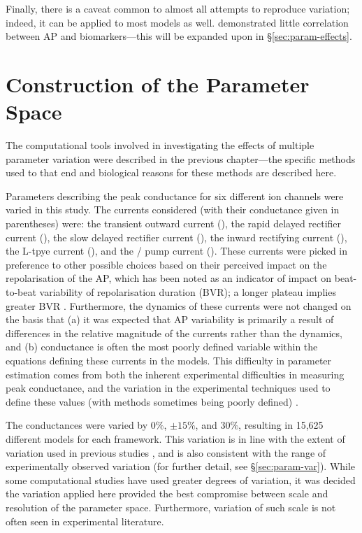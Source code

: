 \documentclass[../thesis-main.tex]{subfiles}
\begin{document}
Finally, there is a caveat common to almost all attempts to reproduce variation; indeed, it can be applied to most models as well. \citet{Walmsley2013} demonstrated little correlation between AP and \ca{} biomarkers---this will be expanded upon in \S\ref{sec:param-effects}.

\section{Construction of the Parameter Space}
\label{sec:paramSpace-methods}
The computational tools involved in investigating the effects of multiple parameter variation were described in the previous chapter---the specific methods used to that end and biological reasons for these methods are described here.

Parameters describing the peak conductance for six different ion channels were varied in this study. The currents considered (with their conductance given in parentheses) were: the transient outward current (\gto{}), the rapid delayed rectifier \K{} current (\gkr{}), the slow delayed rectifier \K{} current (\gks{}), the inward rectifying \K{} current (\gkix{}), the L-tpye \ca{} current (\gca{}), and the \na{}/\K{} pump current (\gnak{}). These currents were picked in preference to other possible choices based on their perceived impact on the repolarisation of the AP, which has been noted as an indicator of impact on beat-to-beat variability of repolarisation duration (BVR); a longer plateau implies greater BVR \citep{Heijman2013}. Furthermore, the dynamics of these currents were not changed on the basis that (a) it was expected that AP variability is primarily a result of differences in the relative magnitude of the currents rather than the dynamics, and (b) conductance is often the most poorly defined variable within the equations defining these currents in the models. This difficulty in parameter estimation comes from both the inherent experimental difficulties in measuring peak conductance, and the variation in the experimental techniques used to define these values (with methods sometimes being poorly defined) \citep{Quinn2011}.

The conductances were varied by $0\%$, $\pm15\%$, and $30\%$, resulting in 15,625 different models for each framework. This variation is in line with the extent of variation used in previous studies \citep{Romero2009, Romero2011, Walmsley2013}, and is also consistent with the range of experimentally observed variation \citep{Fulop2004, Iost1998, Li1999, Szentadrassy2005, Verkerk2005, Sims2008} (for further detail, see \S\ref{sec:param-var}). While some computational studies have used greater degrees of variation, it was decided the variation applied here provided the best compromise between scale and resolution of the parameter space. Furthermore, variation of such scale is not often seen in experimental literature.
\end{document}
